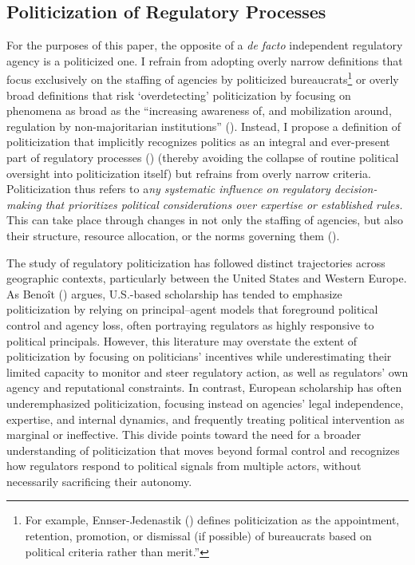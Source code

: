 \documentclass[
  11pt,
  letterpaper,
  DIV=11,
  numbers=noendperiod]{scrartcl}
\begin{document}
\subsection{Politicization of Regulatory
Processes}\label{politicization-of-regulatory-processes}

For the purposes of this paper, the opposite of a \emph{de facto}
independent regulatory agency is a politicized one. I refrain from
adopting overly narrow definitions that focus exclusively on the
staffing of agencies by politicized bureaucrats\footnote{For example,
  Ennser-Jedenastik ()
  defines politicization as the appointment, retention, promotion, or
  dismissal (if possible) of bureaucrats based on political criteria
  rather than merit.''} or overly broad definitions that risk
`overdetecting' politicization by focusing on phenomena as broad as the
``increasing awareness of, and mobilization around, regulation by
non-majoritarian institutions'' (). Instead, I propose a definition of politicization that
implicitly recognizes politics as an integral and ever-present part of
regulatory processes () (thereby
avoiding the collapse of routine political oversight into politicization
itself) but refrains from overly narrow criteria. Politicization thus
refers to a\emph{ny systematic influence on regulatory decision-making
that prioritizes political considerations over expertise or established
rules.} This can take place through changes in not only the staffing of
agencies, but also their structure, resource allocation, or the norms
governing them ().

The study of regulatory politicization has followed distinct
trajectories across geographic contexts, particularly between the United
States and Western Europe. As Benoît ()
argues, U.S.-based scholarship has tended to emphasize politicization by
relying on principal--agent models that foreground political control and
agency loss, often portraying regulators as highly responsive to
political principals. However, this literature may overstate the extent
of politicization by focusing on politicians' incentives while
underestimating their limited capacity to monitor and steer regulatory
action, as well as regulators' own agency and reputational constraints.
In contrast, European scholarship has often underemphasized
politicization, focusing instead on agencies' legal independence,
expertise, and internal dynamics, and frequently treating political
intervention as marginal or ineffective. This divide points toward the
need for a broader understanding of politicization that moves beyond
formal control and recognizes how regulators respond to political
signals from multiple actors, without necessarily sacrificing their
autonomy.
\end{document}
